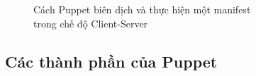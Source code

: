 \begin{figure}[h!]
    \begin{center}
    \end{center}
    \caption{Cách Puppet biên dịch và thực hiện một manifest\\ trong chế độ Client-Server}
    \label{fig:puppet_dataflow}
\end{figure}

\clearpage
\subsection{Các thành phần của Puppet}

